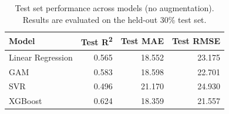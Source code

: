 
\begin{table}
    \caption{Test set performance across models (no augmentation).
             Results are evaluated on the held-out 30\% test set.}
    \label{tab:model_performance_test}
    \centering
    \small
    \begin{tabular}{lrrr}
        \toprule
        Model & Test R\textsuperscript{2} & Test MAE & Test RMSE \\
        \midrule
        Linear Regression & 0.565 & 18.552 & 23.175 \\
        GAM & 0.583 & 18.598 & 22.701 \\
        SVR & 0.496 & 21.170 & 24.930 \\
        XGBoost & 0.624 & 18.359 & 21.557 \\
        \bottomrule
    \end{tabular}
\end{table}
